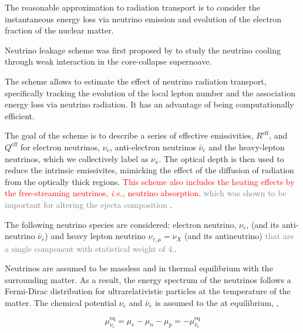 \documentclass[11pt,a4paper,headinclude=true,DIV=14,BCOR=8mm,chapterprefix,listof=totoc,twoside,openright,abstracton]{scrbook}
\newcommand{\red}[1]{\textcolor{red}{#1}}
\newcommand{\gray}[1]{\textcolor{gray}{#1}}
\begin{document}
The reasonable approximation to radiation transport is to consider the instantaneous energy loss via neutrino emission and evolution of the electron fraction of the nuclear matter.

Neutrino leakage scheme was first proposed by \cite{vanRiper:1981mko} to study the neutrino cooling through weak interaction in the core-collapse supernoave.

The scheme allows to estimate the effect of neutrino radiation transport, specifically tracking the evolution of the local lepton number and the association energy loss via neutrino radiation.
It has an advantage of being computationally efficient.

The goal of the scheme is to describe a series of effective emissivities, $R^{\text{eff}}$, and $Q^{\text{eff}}$ for electron neutrinos, $\nu_e$, anti-electron neutrinos $\bar{\nu}_e$ and the heavy-lepton neutrinos, which we collectively label as $\nu_x$.
The optical depth is then used to reduce the intrinsic emissivites, mimicking the effect of the diffusion of radiation from the optically thick regions.
\red{This scheme also includes the heating effects by the free-streaming neutrinos, \textit{i.e.,} neutrino absorption}. \gray{ which was shown to be important for altering the ejecta composition }.



The following neutrino species are considered: electron neutrino, $\nu_e$, (and its anti-neutrino $\bar{\nu}_e$) and heavy lepton neutrino $\nu_{\tau,\mu}=\nu_X$ (and its antineutrino) \gray{that are a single component with statistical weight of 4.}.

Neutrinos are assumed to be massless and in thermal equilibrium with the surrounding matter.
As a result, the energy spectrum of the neutrinos follows a Fermi-Dirac distribution for
ultrarelativistic particles at the temperature of the matter. 
The chemical potential $\nu_e$ and $\bar{\nu}_e$ is assumed to the at equilibrium, \cite{Rosswog:2003rv},

\begin{equation}
    \mu_{\nu_e}^{\text{eq}} = \mu_e - \mu_n - \mu_p = -\mu_{\bar{\nu}_e}^{\text{eq}}
\end{equation}
\end{document}
